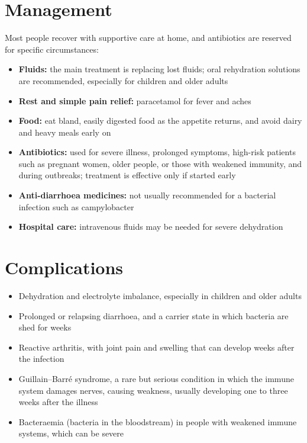 \section*{Management}
Most people recover with supportive care at home, and antibiotics are reserved for specific circumstances:
\begin{itemize}
    \item \textbf{Fluids:} the main treatment is replacing lost fluids; oral rehydration solutions are recommended, especially for children and older adults
    \item \textbf{Rest and simple pain relief:} paracetamol for fever and aches
    \item \textbf{Food:} eat bland, easily digested food as the appetite returns, and avoid dairy and heavy meals early on
    \item \textbf{Antibiotics:} used for severe illness, prolonged symptoms, high-risk patients such as pregnant women, older people, or those with weakened immunity, and during outbreaks; treatment is effective only if started early
    \item \textbf{Anti-diarrhoea medicines:} not usually recommended for a bacterial infection such as campylobacter
    \item \textbf{Hospital care:} intravenous fluids may be needed for severe dehydration
\end{itemize}

\section*{Complications}
\begin{itemize}
    \item Dehydration and electrolyte imbalance, especially in children and older adults
    \item Prolonged or relapsing diarrhoea, and a carrier state in which bacteria are shed for weeks
    \item Reactive arthritis, with joint pain and swelling that can develop weeks after the infection
    \item Guillain--Barré syndrome, a rare but serious condition in which the immune system damages nerves, causing weakness, usually developing one to three weeks after the illness
    \item Bacteraemia (bacteria in the bloodstream) in people with weakened immune systems, which can be severe
\end{itemize}

